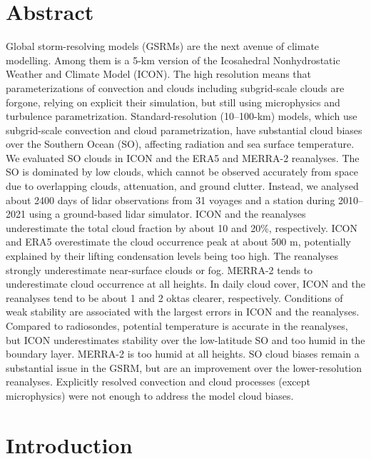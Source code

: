\documentclass[12pt,a4paper]{article}
\begin{document}
\section*{Abstract}

Global storm-resolving models (GSRMs) are the next avenue of climate modelling.
Among them is a 5-km version of the Icosahedral Nonhydrostatic Weather and
Climate Model (ICON). The high resolution means that parameterizations of
convection and clouds including subgrid-scale clouds are forgone, relying on
explicit their simulation, but still using microphysics and turbulence
parametrization.  Standard-resolution (10--100-km) models, which use
subgrid-scale convection and cloud parametrization, have substantial cloud
biases over the Southern Ocean (SO), affecting radiation and sea surface
temperature.  We evaluated SO clouds in ICON and the ERA5 and MERRA-2
reanalyses.  The SO is dominated by low clouds, which cannot be observed
accurately from space due to overlapping clouds, attenuation, and ground
clutter.  Instead, we analysed about 2400 days of lidar observations from 31
voyages and a station during 2010--2021 using a ground-based lidar simulator.
ICON and the reanalyses underestimate the total cloud fraction by about 10 and
20\%, respectively. ICON and ERA5 overestimate the cloud occurrence peak at
about 500 m, potentially explained by their lifting condensation levels being
too high.  The reanalyses strongly underestimate near-surface clouds or fog.
MERRA-2 tends to underestimate cloud occurrence at all heights.  In daily cloud
cover, ICON and the reanalyses tend to be about 1 and 2 oktas clearer,
respectively.  Conditions of weak stability are associated with the largest
errors in ICON and the reanalyses.  Compared to radiosondes, potential
temperature is accurate in the reanalyses, but ICON underestimates stability
over the low-latitude SO and too humid in the boundary layer. MERRA-2 is too
humid at all heights. SO cloud biases remain a substantial issue in the GSRM,
but are an improvement over the lower-resolution reanalyses. Explicitly
resolved convection and cloud processes (except microphysics) were not enough
to address the model cloud biases.

\section{Introduction}
\label{sec:introduction}
\end{document}
